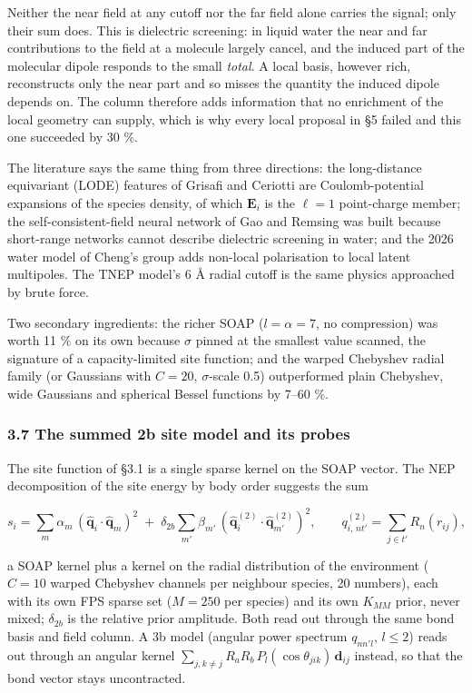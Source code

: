 \documentclass[
  10pt,
]{article}
\begin{document}
Neither the near field at any cutoff nor the far field alone carries the signal; only their sum
does. This is dielectric screening: in liquid water the near and far contributions to the field at a
molecule largely cancel, and the induced part of the molecular dipole responds to the small
\emph{total}. A local basis, however rich, reconstructs only the near part and so misses the
quantity the induced dipole depends on. The column therefore adds information that no enrichment of
the local geometry can supply, which is why every local proposal in §5 failed and this one succeeded
by 30 \%.

The literature says the same thing from three directions: the long-distance equivariant (LODE)
features of Grisafi and Ceriotti are Coulomb-potential expansions of the species density, of which
\(\mathbf E_i\) is the \(\ell=1\) point-charge member; the self-consistent-field neural network of
Gao and Remsing was built because short-range networks cannot describe dielectric screening in
water; and the 2026 water model of Cheng's group adds non-local polarisation to local latent
multipoles. The TNEP model's 6 \AA{} radial cutoff is the same physics approached by brute force.

Two secondary ingredients: the richer SOAP (\(l=\alpha=7\), no compression) was worth 11 \% on its
own because \(\sigma\) pinned at the smallest value scanned, the signature of a capacity-limited
site function; and the warped Chebyshev radial family (or Gaussians with \(C=20\), \(\sigma\)-scale
0.5) outperformed plain Chebyshev, wide Gaussians and spherical Bessel functions by 7--60 \%.

\subsubsection{3.7 The summed 2b site model and its
probes}\label{the-summed-2b-site-model-and-its-probes}

The site function of §3.1 is a single sparse kernel on the SOAP vector. The NEP decomposition of the
site energy by body order suggests the sum

\[
s_i = \sum_m \alpha_m\,(\hat{\mathbf q}_i\cdot\hat{\mathbf q}_m)^{2}
\;+\;\delta_{2b}\sum_{m'} \beta_{m'}\,(\hat{\mathbf q}^{(2)}_i\cdot\hat{\mathbf q}^{(2)}_{m'})^{2},
\qquad
q^{(2)}_{i,\,n t'} = \sum_{j\in t'} R_n(r_{ij}),
\]

a SOAP kernel plus a kernel on the radial distribution of the environment (\(C=10\) warped Chebyshev
channels per neighbour species, 20 numbers), each with its own FPS sparse set (\(M=250\) per
species) and its own \(K_{MM}\) prior, never mixed; \(\delta_{2b}\) is the relative prior amplitude.
Both read out through the same bond basis and field column. A 3b model (angular power spectrum
\(q_{nn'l}\), \(l\le2\)) reads out through an angular kernel
\(\sum_{j,k\ne j}R_aR_b\,P_l(\cos\theta_{jik})\,\mathbf d_{ij}\) instead, so that the bond vector
stays uncontracted.
\end{document}
